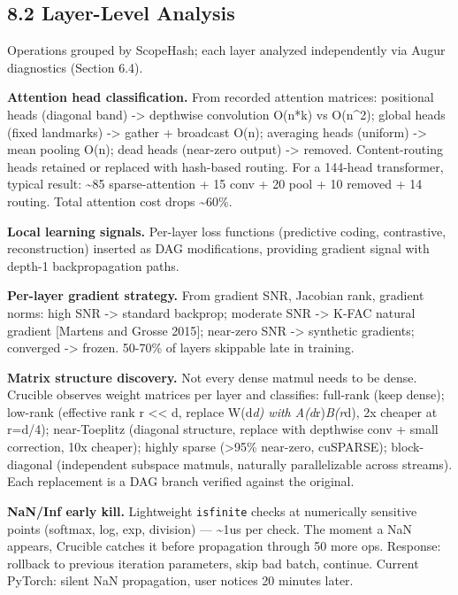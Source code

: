 \subsection{8.2 Layer-Level Analysis}\label{layer-level-analysis}

Operations grouped by ScopeHash; each layer analyzed independently via Augur diagnostics (Section 6.4).

\textbf{Attention head classification.} From recorded attention matrices: positional heads (diagonal band) -\textgreater{} depthwise convolution O(n*k) vs O(n\^{}2); global heads (fixed landmarks) -\textgreater{} gather + broadcast O(n); averaging heads (uniform) -\textgreater{} mean pooling O(n); dead heads (near-zero output) -\textgreater{} removed. Content-routing heads retained or replaced with hash-based routing. For a 144-head transformer, typical result: \textasciitilde85 sparse-attention + 15 conv + 20 pool + 10 removed + 14 routing. Total attention cost drops \textasciitilde60\%.

\textbf{Local learning signals.} Per-layer loss functions (predictive coding, contrastive, reconstruction) inserted as DAG modifications, providing gradient signal with depth-1 backpropagation paths.

\textbf{Per-layer gradient strategy.} From gradient SNR, Jacobian rank, gradient norms: high SNR -\textgreater{} standard backprop; moderate SNR -\textgreater{} K-FAC natural gradient {[}Martens and Grosse 2015{]}; near-zero SNR -\textgreater{} synthetic gradients; converged -\textgreater{} frozen. 50-70\% of layers skippable late in training.

\textbf{Matrix structure discovery.} Not every dense matmul needs to be dense. Crucible observes weight matrices per layer and classifies: full-rank (keep dense); low-rank (effective rank r \textless\textless{} d, replace W(d\emph{d) with A(d}r)\emph{B(r}d), 2x cheaper at r=d/4); near-Toeplitz (diagonal structure, replace with depthwise conv + small correction, 10x cheaper); highly sparse (\textgreater95\% near-zero, cuSPARSE); block-diagonal (independent subspace matmuls, naturally parallelizable across streams). Each replacement is a DAG branch verified against the original.

\textbf{NaN/Inf early kill.} Lightweight \texttt{isfinite} checks at numerically sensitive points (softmax, log, exp, division) --- \textasciitilde1us per check. The moment a NaN appears, Crucible catches it before propagation through 50 more ops. Response: rollback to previous iteration parameters, skip bad batch, continue. Current PyTorch: silent NaN propagation, user notices 20 minutes later.

